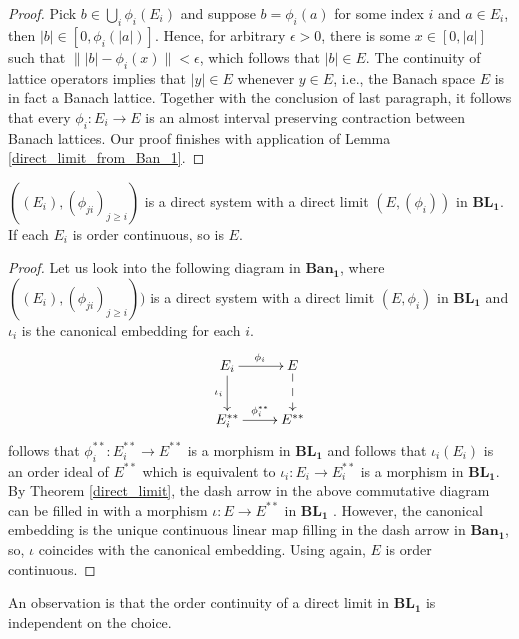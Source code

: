 \begin{proof}
	Pick $b\in \bigcup_{i}\phi_{i}(E_i)$ and suppose $b=\phi_{i}(a)$ for some index $i$ and $a\in E_i$, then $|b|\in [0,\phi_{i}(|a|)]$. Hence, for arbitrary $\epsilon>0$, there is some $x\in [0,|a|]$ such that $\||b|-\phi_{i}(x)\|<\epsilon$, which follows that $|b|\in E$. The continuity of lattice operators implies that $|y|\in E$ whenever $y\in E$, i.e., the Banach space $E$ is in fact a Banach lattice. Together with the conclusion of last paragraph, it follows that every $\phi_i:E_i\to E$ is an %
	almost interval preserving contraction between Banach lattices. 
	Our proof finishes with application of Lemma \ref{direct_limit_from_Ban_1}.
\end{proof}

\begin{theorem}\label{direct_limit_order_continuous}
    $((E_i),(\phi_{ji})_{j\geq i})$ is a direct system with a direct limit $(E,(\phi_i))$ in $\mathbf{BL_1}$.  If each $E_i$ is order continuous,  so is $E$.
\end{theorem}
\begin{proof}
Let us look into the following diagram in $\mathbf{Ban_1}$,  where $((E_i),(\phi_{ji})_{j\geq  i}))$ is a direct system with a direct limit $(E,\phi_i)$ in $\mathbf{BL_1}$ and $\iota_i$ is the canonical embedding for each $i$.
      $$\xymatrix{ 
        E_i\ar[r]^{\phi_i}\ar[d]_{\iota_i}  & E\ar@{-->}[d]\\
        E_i^{**}\ar[r]^{\phi_i^{**}} & E^{**}
        }$$
    \cite[Proposition 1.3.13]{meyer-nieberg_BANACH_LATTICES:1991} follows that $\phi_i^{**}:E_i^{**}\to E^{**}$ is a morphism in $\mathbf{BL_1}$ and \cite[Theorem 2.4.1]{meyer-nieberg_BANACH_LATTICES:1991} follows that $\iota_i(E_i)$ is an order ideal of $E^{**}$ which is equivalent to $\iota_i: E_i\to E_i^{**}$ is a morphism in $\mathbf{BL_1}$. By Theorem \ref{direct_limit}, the dash arrow in the above commutative diagram  can be filled in with a morphism $\iota: E\to E^{**}$ in $\mathbf{BL_1}$ . However, the canonical embedding is the unique continuous linear map filling in the dash arrow in $\mathbf{Ban_1}$, so, $\iota$ coincides with the canonical embedding. Using \cite[Theorem 2.4.1]{meyer-nieberg_BANACH_LATTICES:1991} again, $E$ is order continuous.
\end{proof}
An observation is that the order continuity of a direct limit in $\mathbf{BL_1}$ is independent on the choice.%



